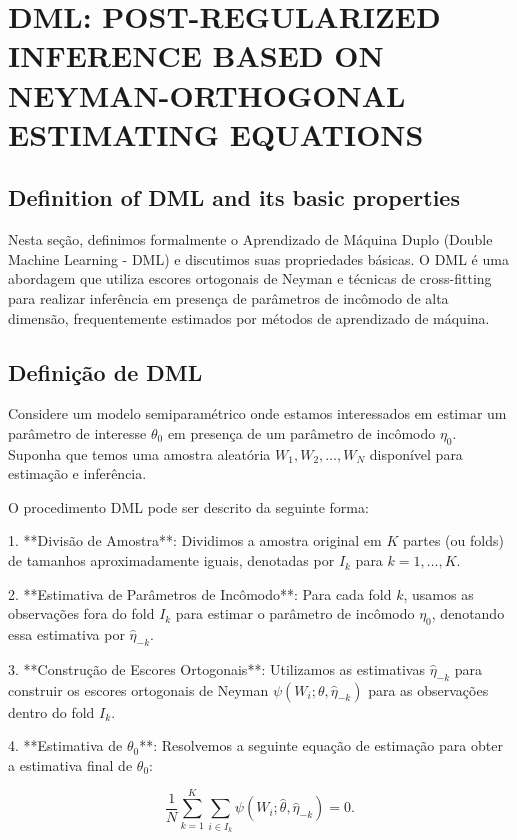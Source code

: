 \documentclass[a4paper,12pt]{article}[abntex2]
\begin{document}
\newpage

\section{DML:  POST-REGULARIZED  INFERENCE  BASED  ON NEYMAN-ORTHOGONAL  ESTIMATING  EQUATIONS}

\subsection{Deﬁnition  of  DML and  its basic  properties}

Nesta seção, definimos formalmente o Aprendizado de Máquina Duplo (Double Machine Learning - DML) e discutimos suas propriedades básicas. O DML é uma abordagem que utiliza escores ortogonais de Neyman e técnicas de cross-fitting para realizar inferência em presença de parâmetros de incômodo de alta dimensão, frequentemente estimados por métodos de aprendizado de máquina.

\subsection*{Definição de DML}

Considere um modelo semiparamétrico onde estamos interessados em estimar um parâmetro de interesse $\theta_0$ em presença de um parâmetro de incômodo $\eta_0$. Suponha que temos uma amostra aleatória $W_1, W_2, \ldots, W_N$ disponível para estimação e inferência.

O procedimento DML pode ser descrito da seguinte forma:

1. **Divisão de Amostra**: Dividimos a amostra original em $K$ partes (ou folds) de tamanhos aproximadamente iguais, denotadas por $I_k$ para $k=1, \ldots, K$.

2. **Estimativa de Parâmetros de Incômodo**: Para cada fold $k$, usamos as observações fora do fold $I_k$ para estimar o parâmetro de incômodo $\eta_0$, denotando essa estimativa por $\hat{\eta}_{-k}$.

3. **Construção de Escores Ortogonais**: Utilizamos as estimativas $\hat{\eta}_{-k}$ para construir os escores ortogonais de Neyman $\psi(W_i; \theta, \hat{\eta}_{-k})$ para as observações dentro do fold $I_k$.

4. **Estimativa de $\theta_0$**: Resolvemos a seguinte equação de estimação para obter a estimativa final de $\theta_0$:

\[
\frac{1}{N} \sum_{k=1}^K \sum_{i \in I_k} \psi(W_i; \hat{\theta}, \hat{\eta}_{-k}) = 0.
\]
\end{document}
